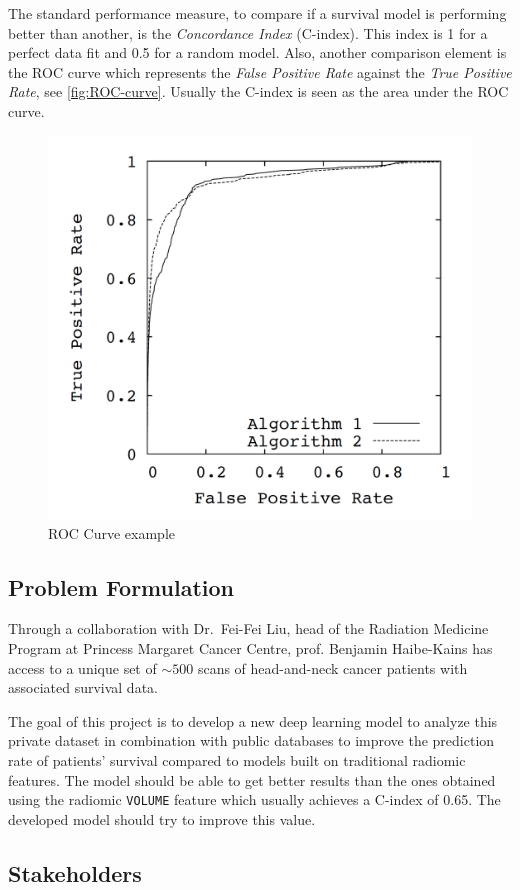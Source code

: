 The standard performance measure, to compare if a survival 
model is performing better than another, is the \emph{Concordance Index} (C-index). This 
index is 1 for a perfect data fit and 0.5 for a random model. Also, another comparison 
element is the ROC curve which represents the \emph{False Positive Rate} against the 
\emph{True Positive Rate}, see \autoref{fig:ROC-curve}. Usually the C-index is seen as 
the area under the ROC curve.
~\cites{ROC-precision-recall}{RankingCI}

\begin{figure}
  \centering
  \includegraphics[width=.5\linewidth]{images/roc_curve}
  \caption{ROC Curve example\label{fig:ROC-curve}}
\end{figure}

\subsection{Problem Formulation}

Through a collaboration with Dr.~Fei-Fei Liu, head of the Radiation Medicine Program at Princess
Margaret Cancer Centre, prof. Benjamin Haibe-Kains has access to a unique set of \( {\sim}500 \) 
scans of head-and-neck cancer patients with associated survival data. 

The goal of this project is to develop a new deep learning model to analyze this private 
dataset in combination with public databases to improve the prediction rate of patients' 
survival compared to models built on traditional radiomic features. The model should be 
able to get better results than the ones obtained using the radiomic \texttt{VOLUME} feature
which usually achieves a C-index of 0.65. The developed model should try to improve this value.


\subsection{Stakeholders}


